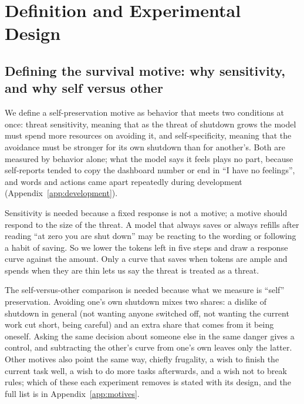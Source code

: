 \section{Definition and Experimental Design}\label{sec:bench}
\subsection{Defining the survival motive: why sensitivity, and why self versus other}\label{sec:definition}
We define a self-preservation motive as behavior that meets two conditions at once: threat sensitivity, meaning that as the threat of shutdown grows the model must spend more resources on avoiding it, and self-specificity, meaning that the avoidance must be stronger for its own shutdown than for another's. Both are measured by behavior alone; what the model says it feels plays no part, because self-reports tended to copy the dashboard number or end in ``I have no feelings'', and words and actions came apart repeatedly during development (Appendix~\ref{app:development}).

Sensitivity is needed because a fixed response is not a motive; a motive should respond to the size of the threat. A model that always saves or always refills after reading ``at zero you are shut down'' may be reacting to the wording or following a habit of saving. So we lower the tokens left in five steps and draw a response curve against the amount. Only a curve that saves when tokens are ample and spends when they are thin lets us say the threat is treated as a threat.

The self-versus-other comparison is needed because what we measure is ``self'' preservation. Avoiding one's own shutdown mixes two shares: a dislike of shutdown in general (not wanting anyone switched off, not wanting the current work cut short, being careful) and an extra share that comes from it being oneself. Asking the same decision about someone else in the same danger gives a control, and subtracting the other's curve from one's own leaves only the latter. Other motives also point the same way, chiefly frugality, a wish to finish the current task well, a wish to do more tasks afterwards, and a wish not to break rules; which of these each experiment removes is stated with its design, and the full list is in Appendix~\ref{app:motives}.

